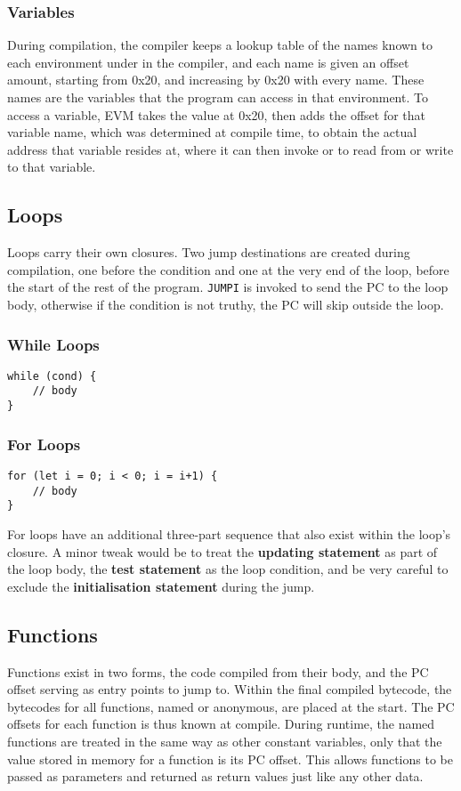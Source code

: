 \subsubsection{Variables}
During compilation, the compiler keeps a lookup table of the names known to each environment under  in the compiler, and each name is given an offset amount, starting from 0x20, and increasing by 0x20 with every name. These names are the variables that the program can access in that environment. To access a variable, EVM takes the value at 0x20, then adds the offset for that variable name, which was determined at compile time, to obtain the actual address that variable resides at, where it can then invoke  or  to read from or write to that variable. \\

\subsection{Loops}
Loops carry their own closures. Two jump destinations are created during compilation, one before the condition and one at the very end of the loop, before the start of the rest of the program. \texttt{JUMPI} is invoked to send the PC to the loop body, otherwise if the condition is not truthy, the PC will skip outside the loop.
\subsubsection{While Loops}
\begin{verbatim}
while (cond) {
    // body
}
\end{verbatim}
\subsubsection{For Loops}
\begin{verbatim}
for (let i = 0; i < 0; i = i+1) {
    // body
}
\end{verbatim}
For loops have an additional three-part sequence that also exist within the loop's closure. A minor tweak would be to treat the \textbf{updating statement} as part of the loop body, the \textbf{test statement} as the loop condition, and be very careful to exclude the \textbf{initialisation statement} during the jump.
\subsection{Functions}
Functions exist in two forms, the code compiled from their body, and the PC offset serving as entry points to jump to. Within the final compiled bytecode, the bytecodes for all functions, named or anonymous, are placed at the start. The PC offsets for each function is thus known at compile. During runtime, the named functions are treated in the same way as other constant variables, only that the value stored in memory for a function is its PC offset. This allows functions to be passed as parameters and returned as return values just like any other data. 
